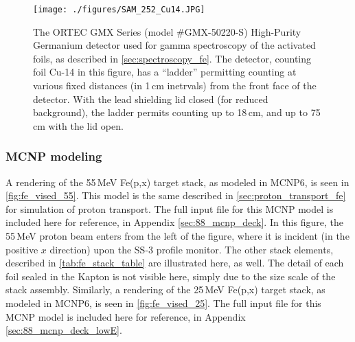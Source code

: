 \begin{figure}
 \centering
 \texttt{[image: ./figures/SAM\_252\_Cu14.JPG]}
 \caption{The ORTEC GMX Series (model \#GMX-50220-S)  High-Purity Germanium detector used for gamma spectroscopy of the activated foils, as described in \autoref{sec:spectroscopy_fe}. The detector, counting foil Cu-14 in this figure, has a \enquote{ladder} permitting counting at various fixed distances (in 1\,cm inetrvals) from the front face of the detector. With the lead shielding lid closed (for reduced background), the ladder permits counting up to 18\,cm, and up to 75\,cm with the lid open.   }
 \label{fig:fe_IMG_1984}
\end{figure}



\subsubsection{MCNP modeling}



% 
% 
%
A rendering of the 55\,MeV Fe(p,x) target stack, as modeled in MCNP6, is seen in \autoref{fig:fe_vised_55}.
This model is the same described in \autoref{sec:proton_transport_fe} for simulation of proton transport.
The full input file for this MCNP model is included here for reference, in Appendix \ref{sec:88_mcnp_deck}.
In this figure, the 55\,MeV proton beam enters from the left of the figure, where it is incident (in the positive $x$ direction) upon the SS-3 profile monitor.
The other stack elements, described in  \autoref{tab:fe_stack_table} are illustrated here, as well.
% 
% 
The detail of each foil sealed in the Kapton is not visible here, simply due to the size scale of the stack assembly.
Similarly, a rendering of the 25\,MeV Fe(p,x) target stack, as modeled in MCNP6, is seen in \autoref{fig:fe_vised_25}.
The full input file for this MCNP model is included here for reference, in Appendix \ref{sec:88_mcnp_deck_lowE}.




